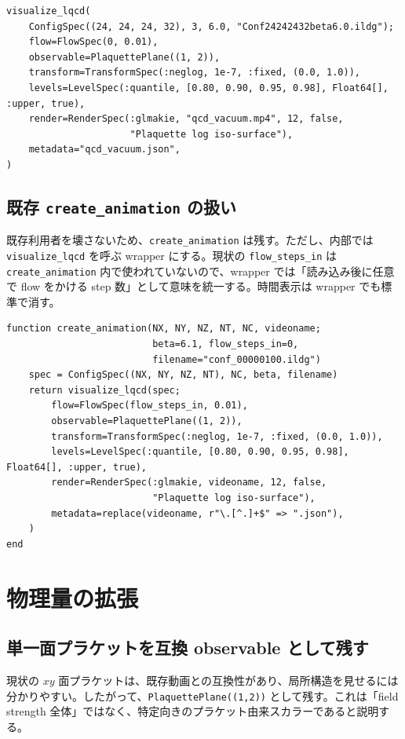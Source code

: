 \documentclass[uplatex,dvipdfmx,ja=standard,11pt,a4paper]{bxjsarticle}
\newcommand{\code}[1]{\texttt{#1}}
\begin{document}
\begin{lstlisting}[style=julia,caption={高水準 API 案}]
visualize_lqcd(
    ConfigSpec((24, 24, 24, 32), 3, 6.0, "Conf24242432beta6.0.ildg");
    flow=FlowSpec(0, 0.01),
    observable=PlaquettePlane((1, 2)),
    transform=TransformSpec(:neglog, 1e-7, :fixed, (0.0, 1.0)),
    levels=LevelSpec(:quantile, [0.80, 0.90, 0.95, 0.98], Float64[], :upper, true),
    render=RenderSpec(:glmakie, "qcd_vacuum.mp4", 12, false,
                      "Plaquette log iso-surface"),
    metadata="qcd_vacuum.json",
)
\end{lstlisting}

\subsection{既存 \code{create\_animation} の扱い}
既存利用者を壊さないため、\code{create\_animation} は残す。ただし、内部では \code{visualize\_lqcd} を呼ぶ wrapper にする。現状の \code{flow\_steps\_in} は \code{create\_animation} 内で使われていないので、wrapper では「読み込み後に任意で flow をかける step 数」として意味を統一する。時間表示は wrapper でも標準で消す。

\begin{lstlisting}[style=julia,caption={互換 wrapper の骨子}]
function create_animation(NX, NY, NZ, NT, NC, videoname;
                          beta=6.1, flow_steps_in=0,
                          filename="conf_00000100.ildg")
    spec = ConfigSpec((NX, NY, NZ, NT), NC, beta, filename)
    return visualize_lqcd(spec;
        flow=FlowSpec(flow_steps_in, 0.01),
        observable=PlaquettePlane((1, 2)),
        transform=TransformSpec(:neglog, 1e-7, :fixed, (0.0, 1.0)),
        levels=LevelSpec(:quantile, [0.80, 0.90, 0.95, 0.98], Float64[], :upper, true),
        render=RenderSpec(:glmakie, videoname, 12, false,
                          "Plaquette log iso-surface"),
        metadata=replace(videoname, r"\.[^.]+$" => ".json"),
    )
end
\end{lstlisting}

\section{物理量の拡張}
\subsection{単一面プラケットを互換 observable として残す}
現状の \(xy\) 面プラケットは、既存動画との互換性があり、局所構造を見せるには分かりやすい。したがって、\code{PlaquettePlane((1,2))} として残す。これは「field strength 全体」ではなく、特定向きのプラケット由来スカラーであると説明する。
\end{document}
